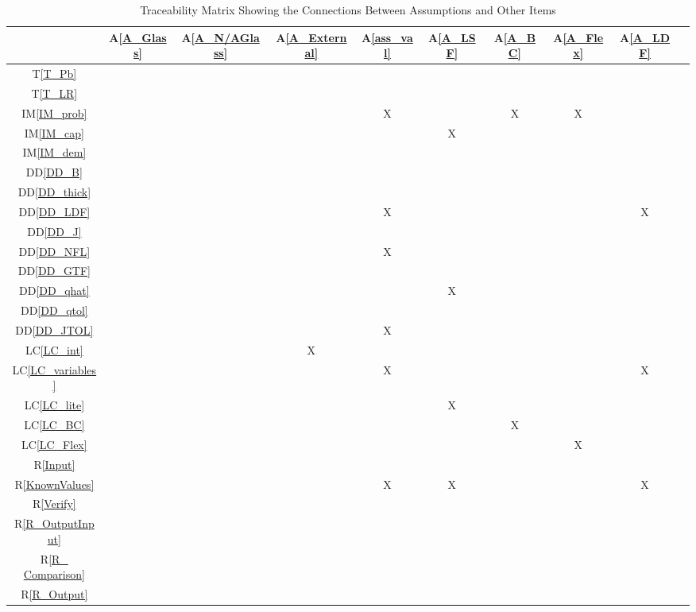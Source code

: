 \documentclass[12pt]{article}
\newcommand{\ddref}[1]{DD\ref{#1}}
\newcommand{\tref}[1]{T\ref{#1}}
\newcommand{\aref}[1]{A\ref{#1}}
\newcommand{\iref}[1]{IM\ref{#1}}
\newcommand{\rref}[1]{R\ref{#1}}
\newcommand{\lcref}[1]{LC\ref{#1}}
\begin{document}
\begin{table}[h!]
\centering
\begin{tabular}{|c|c|c|c|c|c|c|c|c|c|}
\hline
	& \aref{A_Glass}& \aref{A_N/AGlass}& \aref{A_External}& \aref{ass_val}& 
	\aref{A_LSF}& \aref{A_BC}& \aref{A_Flex}& \aref{A_LDF}\\
\hline
\tref{T_Pb}                 & & & & & & & & \\ \hline
\tref{T_LR}                  & & & & & & & & \\ \hline
\iref{IM_prob}           & & & & X & & X & X & \\ \hline
\iref{IM_cap}             & & & & & X & & & \\ \hline
\iref{IM_dem}            & & & & & & & & \\ \hline
\ddref{DD_B}            & & & & & & & & \\ \hline
\ddref{DD_thick}       & & & & & & & & \\ \hline
\ddref{DD_LDF}        & & & & X & & & & X \\ \hline
\ddref{DD_J}             & & & & & & & & \\ \hline
\ddref{DD_NFL}        & & & & X & & & & \\ \hline
\ddref{DD_GTF}        & & & & & & & & \\ \hline
\ddref{DD_qhat}        & & & & & X & & & \\ \hline
\ddref{DD_qtol}         & & & & & & & & \\ \hline
\ddref{DD_JTOL}      & & & & X & & & & \\ \hline
\lcref{LC_int}             & & & X & & & & & \\ \hline
\lcref{LC_variables}   & & & & X & & & & X \\ \hline
\lcref{LC_lite}             & & & & & X & & & \\ \hline
\lcref{LC_BC}             & & & & & & X & & \\ \hline
\lcref{LC_Flex}           & & & & & & & X &\\ \hline
\rref{Input}                  & & & & & & & & \\ \hline
\rref{KnownValues}     & & & & X & X & & & X \\ \hline
\rref{Verify}                 & & & & & & & & \\ \hline
\rref{R_OutputInput}   & & & & & & & & \\ \hline
\rref{R_ Comparison} & & & & & & & & \\ \hline
\rref{R_Output}           & & & & & & & & \\
\hline
\end{tabular}
\caption{Traceability Matrix Showing the Connections Between Assumptions and Other Items}
\label{Table:A_trace}
\end{table}
\end{document}
